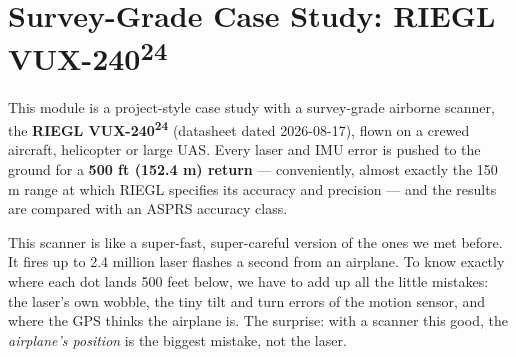 \chapter{Survey-Grade Case Study: RIEGL VUX-240\textsuperscript{24}}

This module is a project-style case study with a survey-grade airborne scanner, the \textbf{RIEGL VUX-240\textsuperscript{24}} (datasheet dated 2026-08-17), flown on a crewed aircraft, helicopter or large UAS. Every laser and IMU error is pushed to the ground for a \textbf{500 ft (152.4 m) return} --- conveniently, almost exactly the 150 m range at which RIEGL specifies its accuracy and precision --- and the results are compared with an ASPRS accuracy class.

\begin{kid}
This scanner is like a super-fast, super-careful version of the ones we met before. It fires up to 2.4 million laser flashes a second from an airplane. To know exactly where each dot lands 500 feet below, we have to add up all the little mistakes: the laser's own wobble, the tiny tilt and turn errors of the motion sensor, and where the GPS thinks the airplane is. The surprise: with a scanner this good, the \emph{airplane's position} is the biggest mistake, not the laser.
\end{kid}


